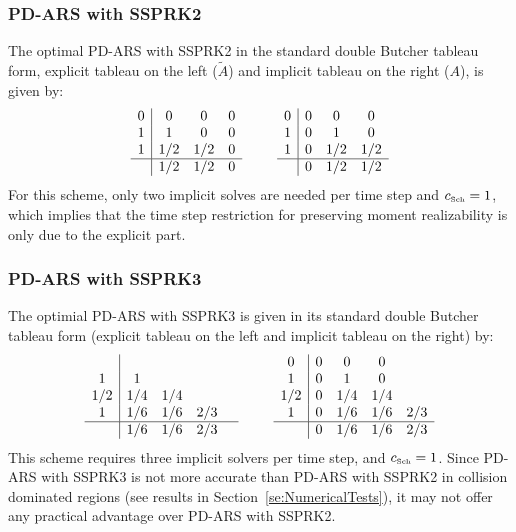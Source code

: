 \subsubsection{PD-ARS with SSPRK2}

The optimal PD-ARS with SSPRK2 in the standard double Butcher tableau form, explicit tableau on the left ($\tilde{A}$) and implicit tableau on the right ($A$), is given by:
\begin{equation}
  \begin{array}{c | c c c}
  	0 & 0   & 0 & 0 \\
  	1 & 1   & 0 & 0 \\
  	1 & 1/2 & 1/2 & 0 \\ \hline
  	  & 1/2 & 1/2 & 0
  \end{array}
  \qquad
  \begin{array}{c | c c c}
  	0 & 0 & 0            & 0            \\
  	1 & 0 & 1            & 0            \\
  	1 & 0 & 1/2 & 1/2 \\ \hline
  	  & 0 & 1/2 & 1/2
  \end{array}
\end{equation}
For this scheme, only two implicit solves are needed per time step and $c_{\mbox{\tiny Sch}}= 1$, which implies that the time step restriction for preserving moment realizability is only due to the explicit part.  

\subsubsection{PD-ARS with SSPRK3}

The optimial PD-ARS with SSPRK3 is given in its standard double Butcher tableau form (explicit tableau on the left and implicit tableau on the right) by:
\begin{equation}
  \begin{array}{c | c c c c}
  	    &     &     &     &  \\
  	 1  & 1   &     &     &  \\
  	1/2 & 1/4 & 1/4 &  \\
  	 1  & 1/6 & 1/6 & 2/3 &  \\ \hline
  	    & 1/6 & 1/6 & 2/3 &
  \end{array}
  \qquad
  \begin{array}{c | c c c c}
  	0 & 0 & 0            & 0            \\
  	1 & 0 & 1            & 0            \\
  	1/2 & 0 & 1/4 & 1/4 \\ 
  	1 & 0 & 1/6 & 1/6 & 2/3\\\hline
  	  & 0 & 1/6 & 1/6 & 2/3
  \end{array}
\end{equation}
This scheme requires three implicit solvers per time step, and $c_{\mbox{\tiny Sch}}= 1$.  
Since PD-ARS with SSPRK3 is not more accurate than PD-ARS with SSPRK2 in collision dominated regions (see results in Section~\ref{se:NumericalTests}), it may not offer any practical advantage over PD-ARS with SSPRK2.  
